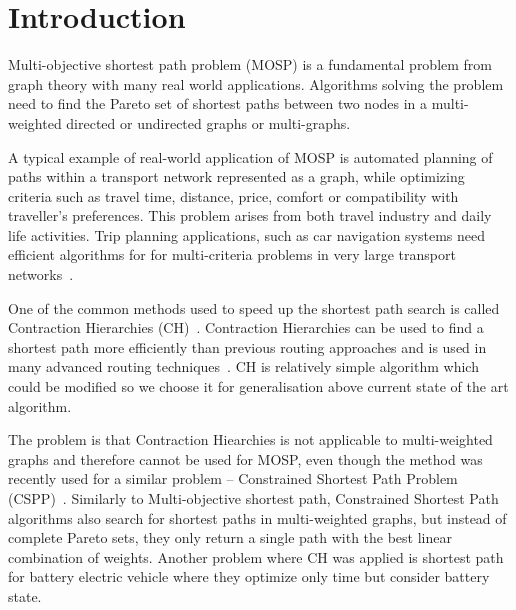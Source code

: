 % 
%  
%  
%  

\section{Introduction} \label{secIntroduction}

Multi-objective shortest path problem (MOSP) is a fundamental problem from
graph theory with many real world applications. Algorithms solving the problem
need to find the Pareto set of shortest paths between two nodes in a
multi-weighted directed or undirected graphs or multi-graphs. 

A typical example of real-world application of MOSP is automated planning of
paths within a transport network represented as a graph, while optimizing
criteria such as travel time, distance, price, comfort or compatibility with
traveller's preferences. This problem arises from both travel industry and
daily life activities. Trip planning applications, such as car navigation
systems need efficient algorithms for for multi-criteria problems in very large
transport networks~\cite{veneti2016time}. 



One of the common methods used to speed up the shortest path search  is called
Contraction Hierarchies (CH)~\cite{geisberger2008contraction}. Contraction
Hierarchies can be used to find a shortest path more efficiently than previous
routing approaches and is used in many advanced routing
techniques~\cite{delling2009engineering}.  CH is relatively simple algorithm
which could be modified so we choose it for generalisation above current state
of the art algorithm.

The problem is that Contraction Hiearchies is not applicable to multi-weighted
graphs and therefore cannot be used for MOSP, even though the method was
recently used for a similar problem -- Constrained Shortest Path Problem
(CSPP)~\cite{pugliese2013survey,funke2013polynomial}. Similarly to
Multi-objective shortest path, Constrained Shortest Path algorithms also search
for shortest paths in multi-weighted graphs, but instead of complete Pareto
sets, they only return a single path with the best linear combination of
weights. Another problem where CH was applied is shortest path for
battery electric vehicle \cite{artmeier2010shortest} where they optimize only
time but consider battery state. 

